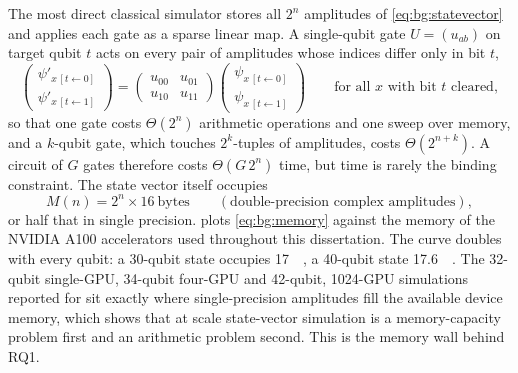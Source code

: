 The most direct classical simulator stores all $2^n$ amplitudes of \cref{eq:bg:statevector} and applies each gate as a sparse linear map. A single-qubit gate $U=(u_{ab})$ on target qubit $t$ acts on every pair of amplitudes whose indices differ only in bit $t$,
\begin{equation}\label{eq:bg:gateapply}
\begin{pmatrix}\psi'_{x\,[t\leftarrow 0]}\\ \psi'_{x\,[t\leftarrow 1]}\end{pmatrix}
=\begin{pmatrix}u_{00}&u_{01}\\ u_{10}&u_{11}\end{pmatrix}
\begin{pmatrix}\psi_{x\,[t\leftarrow 0]}\\ \psi_{x\,[t\leftarrow 1]}\end{pmatrix}
\qquad\text{for all $x$ with bit $t$ cleared},
\end{equation}
so that one gate costs $\Theta(2^n)$ arithmetic operations and one sweep over memory, and a $k$-qubit gate, which touches $2^k$-tuples of amplitudes, costs $\Theta(2^{n+k})$. A circuit of $G$ gates therefore costs $\Theta(G\,2^n)$ time, but time is rarely the binding constraint. The state vector itself occupies
\begin{equation}\label{eq:bg:memory}
M(n)=2^n\times 16\ \text{bytes}\qquad(\text{double-precision complex amplitudes}),
\end{equation}
or half that in single precision.  plots \cref{eq:bg:memory} against the memory of the NVIDIA A100 accelerators \cite{choquette2021a100} used throughout this dissertation. The curve doubles with every qubit: a 30-qubit state occupies \SI{17}{\giga\byte}, a 40-qubit state \SI{17.6}{\tera\byte}. The 32-qubit single-GPU, 34-qubit four-GPU and 42-qubit, 1024-GPU simulations reported for \qgear{} \cite{guo2025qgear} sit exactly where single-precision amplitudes fill the available device memory, which shows that at scale state-vector simulation is a memory-capacity problem first and an arithmetic problem second. This is the memory wall behind RQ1.

